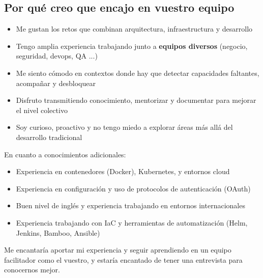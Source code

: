 \documentclass[11pt,a4paper,sans]{moderncv}
\begin{document}
\begin{justify}
\section{Por qué creo que encajo en vuestro equipo}
\begin{itemize}
\item Me gustan los retos que combinan arquitectura, infraestructura y desarrollo
\item Tengo amplia experiencia trabajando junto a \textbf{equipos diversos} (negocio, seguridad, devops, QA ...)
\item Me siento cómodo en contextos donde hay que detectar capacidades faltantes, acompañar y desbloquear
\item Disfruto transmitiendo conocimiento, mentorizar y documentar para mejorar el nivel colectivo
\item Soy curioso, proactivo y no tengo miedo a explorar áreas más allá del desarrollo tradicional
\end{itemize}

En cuanto a conocimientos adicionales:

\begin{itemize}
\item Experiencia en contenedores (Docker), Kubernetes, y entornos cloud
\item Experiencia en configuración y uso de protocolos de autenticación (OAuth)
\item Buen nivel de inglés y experiencia trabajando en entornos internacionales
\item Experiencia trabajando con IaC y herramientas de automatización (Helm, Jenkins, Bamboo, Ansible)
\end{itemize}

Me encantaría aportar mi experiencia y seguir aprendiendo en un equipo facilitador como el vuestro, y estaría encantado de tener una entrevista para conocernos mejor.
\end{justify}

\makeletterclosing
\end{document}

